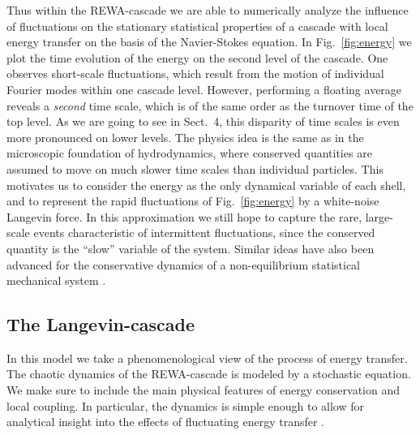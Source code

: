 \documentclass[dc]{svjour}
\begin{document}
Thus within the REWA-cascade we
are able to numerically analyze the influence of fluctuations
on the stationary statistical properties of a cascade with local energy
transfer on the basis of the Navier-Stokes
equation. In Fig.~\ref{fig:energy} we plot the time evolution
of the energy on the second level of the cascade. One observes
short-scale fluctuations, which result from the motion of individual
Fourier modes within one cascade level. However, performing a floating
average reveals a {\it second} time scale, which is of the same order as the
turnover time of the top level. As we are going to see in
Sect.~4, this disparity of time scales is even
more pronounced on lower levels. The physics idea is the same as
in the microscopic foundation of hydrodynamics,
where conserved quantities are assumed to move on much slower time scales
than individual particles.
This motivates us to consider the energy as the only dynamical variable
of each shell, and to represent the rapid fluctuations of
Fig.~\ref{fig:energy} by a white-noise Langevin force. In this approximation
we still hope to capture the rare, large-scale events characteristic
of intermittent fluctuations, since the conserved
quantity is the ``slow'' variable of the system. Similar ideas have also
been advanced for the conservative dynamics of a non-equilibrium
statistical mechanical system \cite{spohn}.

\subsection{The Langevin-cascade}

In this model we take a phenomenological view of the process of energy
transfer. The chaotic dynamics of the REWA-cascade is modeled by a stochastic
equation. We make sure to include the main physical features of
energy conservation and local coupling. In particular,
the dynamics is simple enough to allow for analytical insight into
the effects of fluctuating energy transfer \cite{eggers94}.
\end{document}
